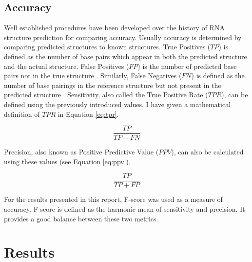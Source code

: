 \documentclass[12pt, a4paper]{article}
\begin{document}
\subsection{Accuracy}
Well established procedures have been developed over
the history of RNA structure prediction for comparing accuracy. Usually accuracy is determined by comparing predicted structures to known
structures. True Positives ($TP$) is defined as the number of base pairs which appear in both the predicted structure and the actual structure. False Positives
($FP$) is the number of predicted base pairs not in the true
structure \cite{lorenz2011viennarna}. Similarly, False Negatives ($FN$) is defined as the number of base
pairings in the reference structure but not present in the predicted structure \cite{lorenz2011viennarna}.
Sensitivity, also called the True Positive Rate ($TPR$), can be defined using the previously introduced values. I have given a mathematical definition of $TPR$ in Equation \ref{eq:tpr}.

\begin{equation} \label{eq:tpr}
 \frac{TP}{TP + FN}
\end{equation}

Precision, also known as Positive Predictive Value ($PPV$), can also be calculated
using these values (see Equation \ref{eq:ppv}).


\begin{equation} \label{eq:ppv}
 \frac{TP}{TP + FP}
\end{equation}

For the results presented in this report, F-score was used as a measure of accuracy. F-score is defined as the harmonic mean of sensitivity and precision. It provides a good balance between these two metrics.

\section{Results}
\label{sec:results}
\end{document}
